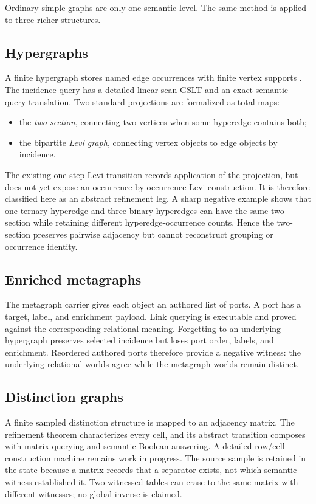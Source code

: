 \documentclass[11pt]{article}
\theoremstyle{remark}
\begin{document}
Ordinary simple graphs are only one semantic level.  The same method is
applied to three richer structures.

\subsection{Hypergraphs}

A finite hypergraph stores named edge occurrences with finite vertex supports
\cite{berge}.
The incidence query has a detailed linear-scan GSLT and an exact semantic
query translation.  Two standard projections are formalized as total maps:
\begin{itemize}[leftmargin=2em]
  \item the \emph{two-section}, connecting two vertices when some hyperedge
        contains both;
  \item the bipartite \emph{Levi graph}, connecting vertex objects to edge
        objects by incidence.
\end{itemize}
The existing one-step Levi transition records application of the projection,
but does not yet expose an occurrence-by-occurrence Levi construction.  It is
therefore classified here as an abstract refinement leg.  A sharp negative
example shows that one ternary hyperedge and three binary hyperedges can have
the same two-section while retaining different hyperedge-occurrence counts.
Hence the two-section preserves pairwise adjacency but cannot reconstruct
grouping or occurrence identity.

\subsection{Enriched metagraphs}

The metagraph carrier gives each object an authored list of ports.  A port has
a target, label, and enrichment payload.  Link querying is executable and
proved against the corresponding relational meaning.  Forgetting to an
underlying hypergraph preserves selected incidence but loses port order,
labels, and enrichment.  Reordered authored ports therefore provide a
negative witness: the underlying relational worlds agree while the metagraph
worlds remain distinct.

\subsection{Distinction graphs}

A finite sampled distinction structure is mapped to an adjacency matrix.
The refinement theorem characterizes every cell, and its abstract transition
composes with matrix querying and semantic Boolean answering.  A detailed
row/cell construction machine remains work in progress.  The source sample is
retained in the state because a matrix records that a separator exists, not
which semantic witness established it.  Two witnessed tables can erase to the
same matrix with different witnesses; no global inverse is claimed.
\end{document}

